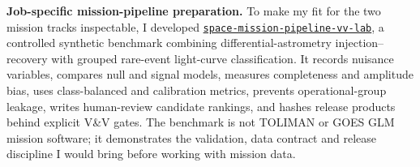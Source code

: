 \textbf{Job-specific mission-pipeline preparation.}
To make my fit for the two mission tracks inspectable, I developed
\href{https://github.com/pkd-45/space-mission-pipeline-vv-lab}{\texttt{space-mission-pipeline-vv-lab}},
a controlled synthetic benchmark combining differential-astrometry
injection--recovery with grouped rare-event light-curve classification.
It records nuisance variables, compares null and signal models, measures
completeness and amplitude bias, uses class-balanced and calibration metrics,
prevents operational-group leakage, writes human-review candidate rankings,
and hashes release products behind explicit V\&V gates. The benchmark is not
TOLIMAN or GOES GLM mission software; it demonstrates the validation, data
contract and release discipline I would bring before working with mission data.
